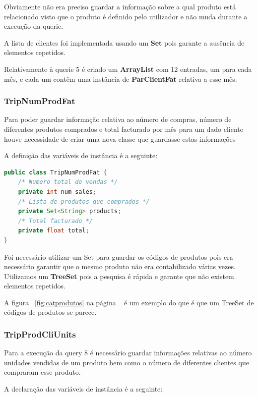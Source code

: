\documentclass[10pt] {article}
\begin{document}
\par Obviamente não era preciso guardar a informação sobre a qual produto está relacionado visto que o produto é definido 
pelo utilizador e não muda durante a execução da querie.
\par A lista de clientes foi implementada usando um \textbf{Set} pois garante a ausência de elementos repetidos.
\par Relativamente à querie 5 é criado um \textbf{ArrayList} com 12 entradas, um para cada mês, e cada um contêm uma 
instância de \textbf{ParClientFat} relativa a esse mês.

\subsubsection{TripNumProdFat}
\par Para poder guardar informação relativa ao número de compras, número de diferentes produtos comprados e total 
facturado por mês para um dado cliente houve necessidade de criar uma nova classe que guardasse estas informações-
\par A definição das variáveis de instância é a seguinte:

\begin{lstlisting}[language=Java]
public class TripNumProdFat {
	/* Numero total de vendas */
	private int num_sales;
	/* Lista de produtos que comprados */
	private Set<String> products;
	/* Total facturado */
	private float total;
}
\end{lstlisting}

\par Foi necessário utilizar um Set para guardar os códigos de produtos pois era necessário garantir que o mesmo produto 
não era contabilizado várias vezes. Utilizamos um \textbf{TreeSet} pois a pesquisa é rápida e garante que não existem 
elementos repetidos.
\par A figura ~\ref{fig:catprodutos} na página ~\pageref{fig:catprodutos} é um exemplo do que é que um TreeSet de 
códigos de produtos se parece.

\subsubsection{TripProdCliUnits}
\par Para a execução da query 8 é necessário guardar informações relativas ao número unidades vendidas de um produto 
bem como o número de diferentes clientes que compraram esse produto.
\par A declaração das variáveis de instância é a seguinte:
\end{document}
